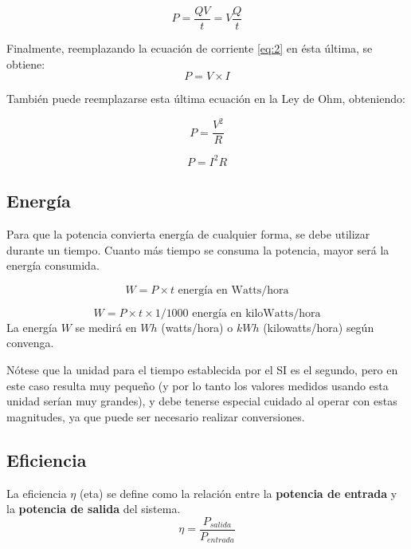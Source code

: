 $$ P =\frac{QV}{t}=V\frac{Q}{t} $$

Finalmente, reemplazando la ecuación de corriente \ref{eq:2} en ésta última, se obtiene:
\begin{equation}
	\label{eq:pot_cc1}
	P = V \times I
\end{equation}

También puede reemplazarse esta última ecuación en la Ley de Ohm, obteniendo:

\begin{equation}
	\label{eq:pot_cc2}
	P = \frac{V^{2}}{R}
\end{equation}

\begin{equation}
	\label{eq:pot_cc3}
	P = I^{2}R
\end{equation}

\subsection{Energía}

Para que la potencia convierta energía de cualquier forma, se debe utilizar durante un tiempo. Cuanto más tiempo se consuma la potencia, mayor será la energía consumida.

\begin{equation}
	\label{eq:w}
	W=P\times t \text{ energía en Watts/hora}
\end{equation}

\begin{equation}
	\label{eq:w_kwh}
	W=P\times t \times 1/1000 \text{ energía en kiloWatts/hora}
\end{equation}
La energía $W$ se medirá en $Wh$ (watts/hora) o $kWh$ (kilowatts/hora) según convenga.

Nótese que la unidad para el tiempo establecida por el SI es el segundo, pero en este caso resulta muy pequeño (y por lo tanto los valores medidos usando esta unidad serían muy grandes), y debe tenerse especial cuidado al operar con estas magnitudes, ya que puede ser necesario realizar conversiones.

\subsection{Eficiencia}

La eficiencia $\eta$ (eta) se define como la relación entre la \textbf{potencia de entrada} y la \textbf{potencia de salida} del sistema.
\begin{equation}
	\label{eq:efi}
	\eta = \frac{P_{salida}}{P_{entrada}}
\end{equation}

